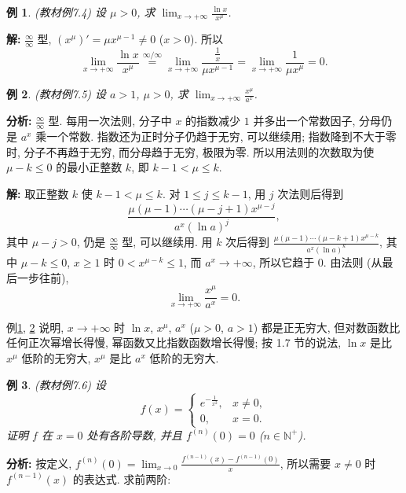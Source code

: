 \documentclass[UTF8,openany]{ctexbook}
\theoremstyle{chinesetextbook}
\newtheorem{example}{例}[section]
\newenvironment{cnsolution}{\par\indent\textbf{解:} \ignorespaces}{\par}
\begin{document}
\begin{example}\label{ex:c2-7-4}
\textnormal{(教材例7.4)} 设 $\mu>0$, 求 $\displaystyle\lim_{x\to+\infty}\frac{\ln x}{x^\mu}$.
\end{example}
\begin{cnsolution}
$\displaystyle\frac\infty\infty$ 型, $(x^\mu)'=\mu x^{\mu-1}\ne0$ ($x>0$). 所以
\[
\lim_{x\to+\infty}\frac{\ln x}{x^\mu}\overset{\infty/\infty}{=}\lim_{x\to+\infty}\frac{\frac1x}{\mu x^{\mu-1}}=\lim_{x\to+\infty}\frac1{\mu x^\mu}=0.
\]
\end{cnsolution}
\begin{example}\label{ex:c2-7-5}
\textnormal{(教材例7.5)} 设 $a>1$, $\mu>0$, 求 $\displaystyle\lim_{x\to+\infty}\frac{x^\mu}{a^x}$.
\end{example}
\par\indent\textbf{分析:} $\displaystyle\frac\infty\infty$ 型. 每用一次法则, 分子中 $x$ 的指数减少 $1$ 并多出一个常数因子, 分母仍是 $a^x$ 乘一个常数. 指数还为正时分子仍趋于无穷, 可以继续用; 指数降到不大于零时, 分子不再趋于无穷, 而分母趋于无穷, 极限为零. 所以用法则的次数取为使 $\mu-k\le0$ 的最小正整数 $k$, 即 $k-1<\mu\le k$.
\begin{cnsolution}
取正整数 $k$ 使 $k-1<\mu\le k$. 对 $1\le j\le k-1$, 用 $j$ 次法则后得到
\[
\frac{\mu(\mu-1)\cdots(\mu-j+1)x^{\mu-j}}{a^x(\ln a)^j},
\]
其中 $\mu-j>0$, 仍是 $\displaystyle\frac\infty\infty$ 型, 可以继续用. 用 $k$ 次后得到 $\displaystyle\frac{\mu(\mu-1)\cdots(\mu-k+1)x^{\mu-k}}{a^x(\ln a)^k}$, 其中 $\mu-k\le0$, $x\ge1$ 时 $0<x^{\mu-k}\le1$, 而 $a^x\to+\infty$, 所以它趋于 $0$. 由法则 (从最后一步往前),
\[
\lim_{x\to+\infty}\frac{x^\mu}{a^x}=0.
\]
\end{cnsolution}
例\ref{ex:c2-7-4}, \ref{ex:c2-7-5} 说明, $x\to+\infty$ 时 $\ln x$, $x^\mu$, $a^x$ ($\mu>0$, $a>1$) 都是正无穷大, 但对数函数比任何正次幂增长得慢, 幂函数又比指数函数增长得慢; 按 1.7 节的说法, $\ln x$ 是比 $x^\mu$ 低阶的无穷大, $x^\mu$ 是比 $a^x$ 低阶的无穷大.
\begin{example}\label{ex:c2-7-6}
\textnormal{(教材例7.6)} 设
\[
f(x)=\begin{cases}e^{-\frac1{x^2}},&x\ne0,\\0,&x=0.\end{cases}
\]
证明 $f$ 在 $x=0$ 处有各阶导数, 并且 $f^{(n)}(0)=0$ ($n\in\mathbb N^+$).
\end{example}
\par\indent\textbf{分析:} 按定义, $\displaystyle f^{(n)}(0)=\lim_{x\to0}\frac{f^{(n-1)}(x)-f^{(n-1)}(0)}x$, 所以需要 $x\ne0$ 时 $f^{(n-1)}(x)$ 的表达式. 求前两阶:
\end{document}
